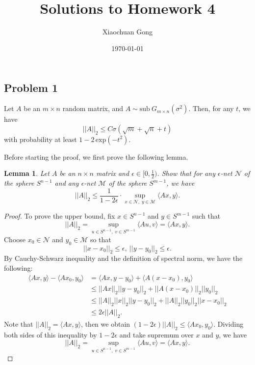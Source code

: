\documentclass[11pt]{article}
\title{Solutions to Homework 4}
\author{Xiaochuan Gong}
\date\today
\newtheorem{lemma}{Lemma}
\begin{document}
\maketitle

\subsection*{Problem 1}
Let $A$ be an $m\times n$ random matrix, and $A\sim \text{sub}\ G_{m\times n}(\sigma^2)$. Then, for any $t$, we have 
\[
||A||_2 \leq C\sigma(\sqrt{m}+\sqrt{n}+t)
\]
with probability at least $1-2\, \text{exp}(-t^2)$. 

\noindent Before starting the proof, we first prove the following lemma. 
\begin{lemma}
    \label{L1}
    Let $A$ be an $n\times n$ matrix and $\epsilon\in[0,\frac{1}{2})$. Show that for any $\epsilon$-net $\mathcal{N}$ of the sphere $S^{n-1}$ and any $\epsilon$-net $\mathcal{M}$ of the sphere $S^{m-1}$, we have 
    \[
    ||A||_2 \leq \frac{1}{1-2\epsilon} \cdot \sup\limits_{x\in\mathcal{N},\; y\in\mathcal{M}} \langle Ax,y \rangle.
    \]
\end{lemma}

\begin{proof}
To prove the upper bound, fix $x\in S^{n-1}$ and $y\in S^{m-1}$ such that 
\[
||A||_2 = \sup\limits_{u\in S^{n-1},\; v\in S^{m-1}}\langle Au,v \rangle = \langle Ax,y \rangle.
\]
Choose $x_0\in\mathcal{N}$ and $y_0\in\mathcal{M}$ so that 
\[
||x-x_0||_2 \leq \epsilon, \ ||y-y_0||_2 \leq \epsilon.
\]
By Cauchy-Schwarz inequality and the definition of spectral norm, we have the following:
\begin{equation*}
    \begin{aligned}
        \langle Ax,y \rangle - \langle Ax_0,y_0 \rangle 
        & = \langle Ax,y-y_0 \rangle + \langle A(x-x_0),y_0 \rangle \\
        & \leq ||Ax||_2||y-y_0||_2 + ||A(x-x_0)||_2||y_0||_2 \\
        & \leq ||A||_2||x||_2||y-y_0||_2 + ||A||_2||y_0||_2||x-x_0||_2 \\
        & \leq 2\epsilon ||A||_2.
    \end{aligned}
\end{equation*}
Note that $||A||_2=\langle Ax,y \rangle$, then we obtain $(1-2\epsilon)||A||_2 \leq \langle Ax_0,y_0 \rangle$. Dividing both sides of this inequality by $1-2\epsilon$ and take supremum over $x$ and $y$, we have 
\[
||A||_2 = \sup\limits_{u\in S^{n-1},\; v\in S^{m-1}}\langle Au,v \rangle = \langle Ax,y \rangle.
\]
\end{proof}
\end{document}
